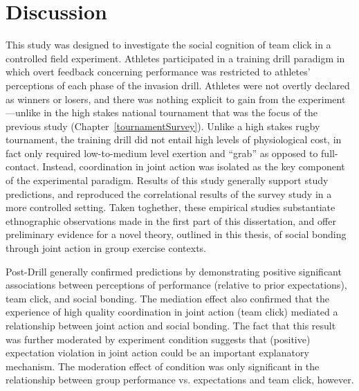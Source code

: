 \clearpage
\section{Discussion}
This study was designed to investigate the social cognition of team click in a controlled field experiment.  Athletes participated in a training drill paradigm in which overt feedback concerning performance was restricted to athletes' perceptions of each phase of the invasion drill.  Athletes were not overtly declared as winners or losers, and there was nothing explicit to gain from the experiment---unlike in the high stakes national tournament that was the focus of the previous study (Chapter~\ref{tournamentSurvey}).  Unlike a high stakes rugby tournament, the training drill did not entail high levels of physiological cost, in fact only required low-to-medium level exertion and ``grab'' as opposed to full-contact. Instead, coordination in joint action was isolated as the key component of the experimental paradigm.  Results of this study generally support study predictions, and reproduced the correlational results of the survey study in a more controlled setting. Taken toghether, these empirical studies substantiate ethnographic observations made in the first part of this dissertation, and offer preliminary evidence for a novel theory, outlined in this thesis, of social bonding through joint action in group exercise contexts.




Post-Drill generally confirmed predictions by demonstrating positive significant associations between perceptions of performance (relative to prior expectations), team click, and social bonding.  The mediation effect also confirmed that the experience of high quality coordination in joint action (team click) mediated a relationship between joint action and social bonding.  The fact that this result was further moderated by experiment condition suggests that (positive) expectation violation in joint action could be an important explanatory mechanism.  The moderation effect of condition was only significant in the relationship between group performance vs. expectations and team click, however.


